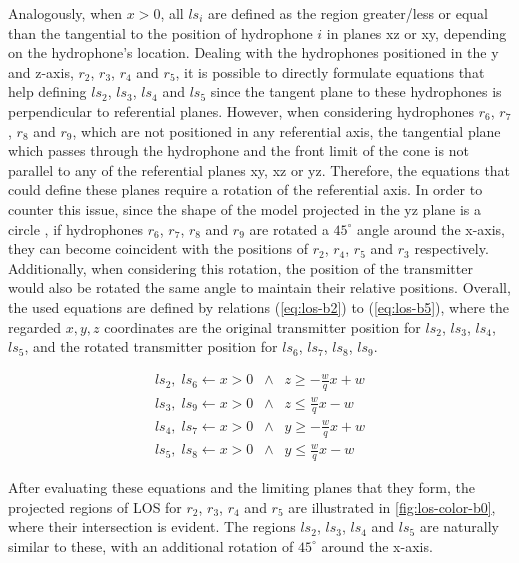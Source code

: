 Analogously, when $x > 0$, all $ls_i$ are defined as the region greater/less or equal than the tangential to the position of hydrophone $i$ in planes xz or xy, depending on the hydrophone's location. Dealing with the hydrophones positioned in the y and z-axis, $r_2$, $r_3$, $r_4$ and $r_5$, it is possible to directly formulate equations that help defining $ls_2$, $ls_3$, $ls_4$ and $ls_5$ since the tangent plane to these hydrophones is perpendicular to referential planes. However, when considering hydrophones $r_6$, $r_7$, $r_8$ and $r_9$, which are not positioned in any referential axis, the tangential plane which passes through the hydrophone and the front limit of the cone is not parallel to any of the referential planes xy, xz or yz. Therefore, the equations that could define these planes require a rotation of the referential axis. In order to counter this issue, since the shape of the model projected in the yz plane is a circle , if hydrophones $r_6$, $r_7$, $r_8$ and $r_9$ are rotated a $45^{\circ}$ angle around the x-axis, they can become coincident with the positions of $r_2$, $r_4$, $r_5$ and $r_3$ respectively. Additionally, when considering this rotation, the position of the transmitter would also be rotated the same angle to maintain their relative positions. Overall, the used equations are defined by relations (\ref{eq:los-b2}) to (\ref{eq:los-b5}), where the regarded $x,y,z$ coordinates are the original transmitter position for $ls_2$, $ls_3$, $ls_4$, $ls_5$, and the rotated transmitter position for $ls_6$, $ls_7$, $ls_8$, $ls_9$.

\begin{eqnarray}
	ls_2, \;  ls_6  \gets x > 0 \; \;  \wedge  \; \; z \geq -\frac{w}{q} x + w  
	\label{eq:los-b2} \\
	ls_3, \;  ls_9 \gets x > 0 \; \;  \wedge  \; \; z \leq \frac{w}{q} x - w  
	\label{eq:los-b3} \\
	ls_4, \;  ls_7 \gets x > 0 \; \;  \wedge  \; \; y \geq -\frac{w}{q} x + w 
	\label{eq:los-b4} \\
	ls_5, \;  ls_8 \gets x > 0 \; \;  \wedge  \; \; y \leq \frac{w}{q} x - w  
	\label{eq:los-b5}
\end{eqnarray}

After evaluating these equations and the limiting planes that they form, the projected regions of LOS for $r_2$, $r_3$, $r_4$ and $r_5$ are illustrated in \ref{fig:los-color-b0}, where their intersection is evident. The regions $ls_2$, $ls_3$, $ls_4$ and $ls_5$ are naturally similar to these, with an additional rotation of $45^{\circ}$ around the x-axis.

